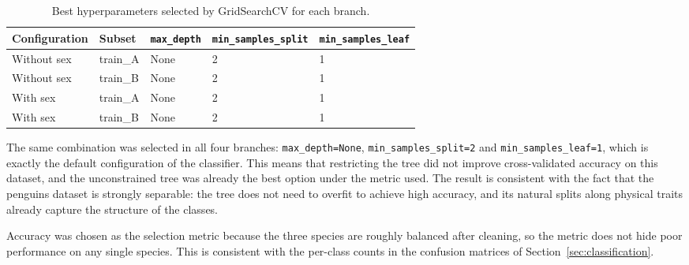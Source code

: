 \begin{table}[htbp]
	\centering
	\caption{Best hyperparameters selected by GridSearchCV for each branch.}
	\label{tab:tuning}
	\begin{tabular}{lllll}
		\toprule
		Configuration & Subset & \texttt{max\_depth} & \texttt{min\_samples\_split} & \texttt{min\_samples\_leaf} \\
		\midrule
		Without sex & train\_A & None & 2 & 1 \\
		Without sex & train\_B & None & 2 & 1 \\
		With sex    & train\_A & None & 2 & 1 \\
		With sex    & train\_B & None & 2 & 1 \\
		\bottomrule
	\end{tabular}
\end{table}

The same combination was selected in all four branches: \texttt{max\_depth=None}, \texttt{min\_samples\_split=2} and \texttt{min\_samples\_leaf=1}, which is exactly the default configuration of the classifier. This means that restricting the tree did not improve cross-validated accuracy on this dataset, and the unconstrained tree was already the best option under the metric used. The result is consistent with the fact that the penguins dataset is strongly separable: the tree does not need to overfit to achieve high accuracy, and its natural splits along physical traits already capture the structure of the classes.

Accuracy was chosen as the selection metric because the three species are roughly balanced after cleaning, so the metric does not hide poor performance on any single species. This is consistent with the per-class counts in the confusion matrices of Section~\ref{sec:classification}.
